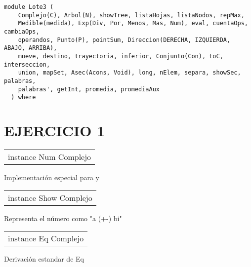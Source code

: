 \label{module:Lote3}
\haddockbeginheader
{\haddockverb\begin{verbatim}
module Lote3 (
    Complejo(C), Arbol(N), showTree, listaHojas, listaNodos, repMax,
    Medible(medida), Exp(Div, Por, Menos, Mas, Num), eval, cuentaOps, cambiaOps,
    operandos, Punto(P), pointSum, Direccion(DERECHA, IZQUIERDA, ABAJO, ARRIBA),
    mueve, destino, trayectoria, inferior, Conjunto(Con), toC, interseccion,
    union, mapSet, Asec(Acons, Void), long, nElem, separa, showSec, palabras,
    palabras', getInt, promedia, promediaAux
  ) where\end{verbatim}}
\haddockendheader

\section{EJERCICIO 1}
\begin{haddockdesc}
\item[\begin{tabular}{@{}l}
instance Num Complejo
\end{tabular}]
{\haddockbegindoc
Implementación especial para \haddockid{(+)} \haddockid{(-)} y \haddockid{(*)}\par}
\end{haddockdesc}
\begin{haddockdesc}
\item[\begin{tabular}{@{}l}
instance Show Complejo
\end{tabular}]
{\haddockbegindoc
Representa el número como "a (+-) bi"\par}
\end{haddockdesc}
\begin{haddockdesc}
\item[\begin{tabular}{@{}l}
instance Eq Complejo
\end{tabular}]
{\haddockbegindoc
Derivación estandar de Eq\par}
\end{haddockdesc}
